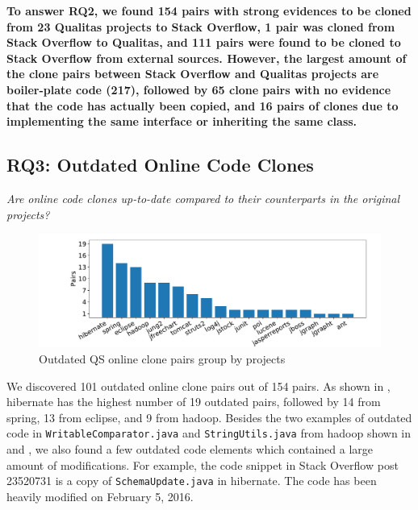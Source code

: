 \documentclass[10pt,journal,compsoc]{IEEEtran}
\begin{document}
\textbf{To answer RQ2, we found 154 pairs with
	strong evidences to be cloned from 23 Qualitas projects to Stack Overflow, 1 pair
	was cloned from Stack Overflow to Qualitas, and
	111 pairs were found to be cloned to Stack Overflow from external
	sources. However, the largest amount of the clone pairs
	between Stack Overflow and Qualitas projects are \linebreak boiler-plate code
	(217), followed by 65 clone pairs with no evidence that the code has actually been copied,
	and 16 pairs of clones due to implementing the same interface or inheriting the same class.} 


\subsection{RQ3: Outdated Online Code Clones}
\vspace{0.25cm}
\textit{Are online code clones up-to-date compared to their counterparts in the original projects?}
\vspace{0.25cm}

\begin{figure}
	\centering
	\includegraphics[width=0.8\linewidth]{outdated}
	\caption{Outdated QS online clone pairs group by projects}
	\label{fig:outdated}
\end{figure}

We discovered 101 outdated online clone pairs out of 154 pairs. As shown in
, \textsf{hibernate} has the highest number of 19 outdated
pairs, followed by 14 from \textsf{spring}, 13 from \textsf{eclipse}, and 9 from
\textsf{hadoop}. Besides the two examples of outdated code in %
{\small{\texttt{WritableComparator.java}}} and
{\small{\texttt{StringUtils.java}}} from \textsf{hadoop} shown in
 and , we also found a few
outdated code elements which contained a large amount of modifications. For
example, the code snippet in Stack Overflow post 23520731 is a copy of
{\small{\texttt{SchemaUpdate.java}}} in \textsf{hibernate}. The code has been
heavily modified on February 5, 2016.

\end{document}
